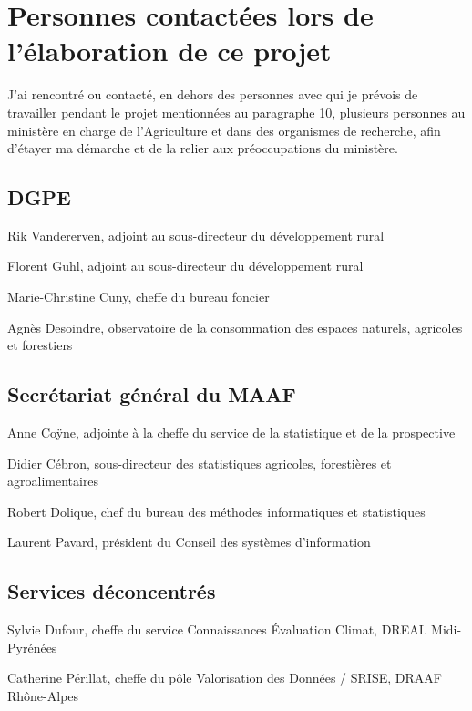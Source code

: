 \section
{Personnes contactées lors de l’élaboration de ce projet}

J’ai rencontré ou contacté, en dehors des personnes avec qui je prévois de travailler pendant le projet mentionnées au paragraphe 10, plusieurs personnes au ministère en charge de l’Agriculture et dans des organismes de recherche, afin d’étayer ma démarche et de la relier aux préoccupations du ministère.

\subsection{DGPE}

\startitemize
\item Rik Vandererven, adjoint au sous-directeur du développement rural
\item Florent Guhl, adjoint au sous-directeur du développement rural
\item Marie-Christine Cuny, cheffe du bureau foncier
\item Agnès Desoindre, observatoire de la consommation des espaces naturels, agricoles et forestiers
\stopitemize

\subsection{Secrétariat général du MAAF}

\startitemize
\item Anne Coÿne, adjointe à la cheffe du service de la statistique et de la prospective
\item Didier Cébron, sous-directeur des statistiques agricoles, forestières et agroalimentaires
\item Robert Dolique, chef du bureau des méthodes informatiques et statistiques
\item Laurent Pavard, président du Conseil des systèmes d’information
\stopitemize


\subsection{Services déconcentrés}

\startitemize
\item Sylvie Dufour, cheffe du service Connaissances Évaluation Climat, DREAL Midi-Pyrénées
\item Catherine Périllat, cheffe du pôle Valorisation des Données / SRISE, DRAAF Rhône-Alpes
\stopitemize


